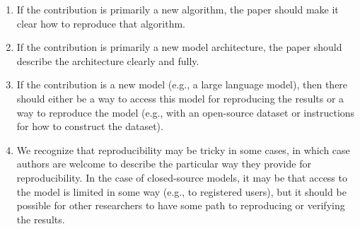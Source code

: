 \documentclass{article}
\begin{document}
\begin{enumerate}
\begin{itemize}
\begin{enumerate}
            \item If the contribution is primarily a new algorithm, the paper should make it clear how to reproduce that algorithm.
            \item If the contribution is primarily a new model architecture, the paper should describe the architecture clearly and fully.
            \item If the contribution is a new model (e.g., a large language model), then there should either be a way to access this model for reproducing the results or a way to reproduce the model (e.g., with an open-source dataset or instructions for how to construct the dataset).
            \item We recognize that reproducibility may be tricky in some cases, in which case authors are welcome to describe the particular way they provide for reproducibility. In the case of closed-source models, it may be that access to the model is limited in some way (e.g., to registered users), but it should be possible for other researchers to have some path to reproducing or verifying the results.
        \end{enumerate}
    \end{itemize}



\end{enumerate}
\end{document}
